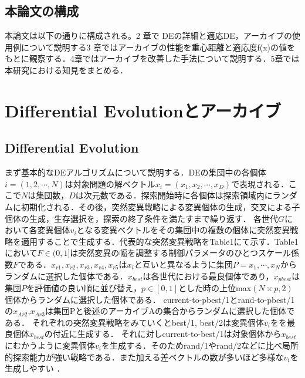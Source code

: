 \documentclass[a4paper,11pt,oneside,openany]{jsbook}
\begin{document}
\section{本論文の構成}
本論文は以下の通りに構成される。2 章で DEの詳細と適応DE，アーカイブの使用例について説明する3 章ではアーカイブの性能を重心距離と適応度f(x)の値をもとに観察する．4章ではアーカイブを改善した手法について説明する．5章では本研究における知見をまとめる．

\chapter{Differential Evolutionとアーカイブ}
\section{Differential Evolution}
まず基本的なDEアルゴリズムについて説明する．DEの集団中の各個体${i} = (1, 2, \cdots, N)$は対象問題の解ベクトル${x_i} = (x_1, x_2, \cdots, x_D)$で表現される．ここで$N$は集団数，$D$は次元数である．探索開始時に各個体は探索領域内にランダムに初期化される．その後，突然変異戦略による変異個体の生成，交叉による子個体の生成，生存選択を，探索の終了条件を満たすまで繰り返す．
各世代$G$において各変異個体${v_i}$となる変異ベクトルをその集団中の複数の個体に突然変異戦略を適用することで生成する．代表的な突然変異戦略をTable1にて示す．Table1において${F\in(0,1]}$は突然変異の幅を調整する制御パラメータのひとつスケール係数$F$である．$x_{r1},x_{r2},x_{r3},x_{r4},x_{r5}$は${x_i}$と互いと異なるように集団$P = {x_1, \cdots, x_N}$からランダムに選択した個体である．$x_{best}$は各世代における最良個体であり，$x_{pbest}$は集団$P$を評価値の良い順に並び替え，${p\in[0,1]}とした時の上位$max$(N \times p, 2)$個体からランダムに選択した個体である．
current-to-pbest/1とrand-to-pbest/1の${x_{Ar2}}$,${x_{Ar3}}$は集団Pと後述のアーカイブAの集合からランダムに選択した個体である．
それぞれの突然変異戦略をみていくとbest/1, best/2は変異個体{$v_i$}をを最良個体$x_{best}$の付近に生成する．
それに対しcurrent-to-best/1は対象個体から$x_{best}$にむかうように変異個体{$v_i$}を生成する．そのためrand/1やrand/2などに比べ局所的探索能力が強い戦略である．また加える差ベクトルの数が多いほど多様な{$v_i$}を生成しやすい   ．
\end{document}
